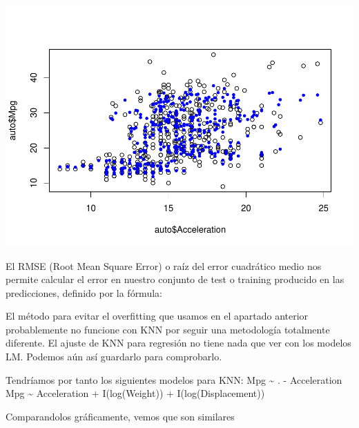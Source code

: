 \documentclass[
]{article}
\newenvironment{Shaded}{\begin{snugshade}}{\end{snugshade}}
\newcommand{\DataTypeTok}[1]{\textcolor[rgb]{0.13,0.29,0.53}{#1}}
\newcommand{\DecValTok}[1]{\textcolor[rgb]{0.00,0.00,0.81}{#1}}
\newcommand{\KeywordTok}[1]{\textcolor[rgb]{0.13,0.29,0.53}{\textbf{#1}}}
\newcommand{\NormalTok}[1]{#1}
\newcommand{\OperatorTok}[1]{\textcolor[rgb]{0.81,0.36,0.00}{\textbf{#1}}}
\newcommand{\StringTok}[1]{\textcolor[rgb]{0.31,0.60,0.02}{#1}}
\begin{document}
\begin{Shaded}
\end{Shaded}

\begin{center}\includegraphics{Regresion_files/figure-latex/unnamed-chunk-32-2} \end{center}

El RMSE (Root Mean Square Error) o raíz del error cuadrático medio nos
permite calcular el error en nuestro conjunto de test o training
producido en las predicciones, definido por la fórmula:

El método para evitar el overfitting que usamos en el apartado anterior
probablemente no funcione con KNN por seguir una metodología totalmente
diferente. El ajuste de KNN para regresión no tiene nada que ver con los
modelos LM. Podemos aún así guardarlo para comprobarlo.

Tendríamos por tanto los siguientes modelos para KNN: Mpg
\textasciitilde{} . - Acceleration Mpg \textasciitilde{} Acceleration +
I(log(Weight)) + I(log(Displacement))

Comparandolos gráficamente, vemos que son similares
\end{document}
